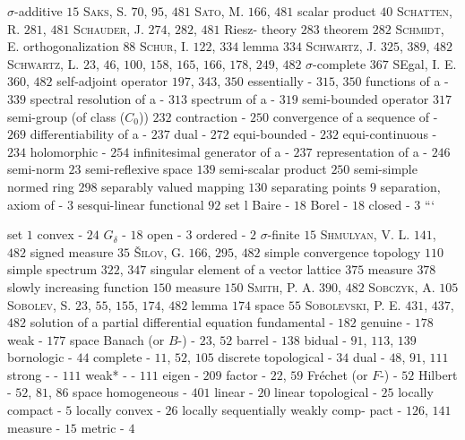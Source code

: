$\sigma$-additive $15$ \textsc{Saks}, S. $70$, $95$, $481$ \textsc{Sato}, M. $166$, $481$ scalar product $40$ \textsc{Schatten}, R. $281$, $481$ \textsc{Schauder}, J. $274$, $282$, $481$ Riesz- theory $283$ theorem $282$ \textsc{Schmidt}, E. orthogonalization $88$ \textsc{Schur}, I. $122$, $334$ lemma $334$ \textsc{Schwartz}, J. $325$, $389$, $482$ \textsc{Schwartz}, L. $23$, $46$, $100$, $158$, $165$, $166$, $178$, $249$, $482$ $\sigma$-complete $367$ SEgal, I. E. $360$, $482$ self-adjoint operator $197$, $343$, $350$ essentially - $315$, $350$ functions of a - $339$ spectral resolution of a - $313$ spectrum of a - $319$ semi-bounded operator $317$ semi-group (of class ($C_0$)) $232$ contraction - $250$ convergence of a sequence of - $269$ differentiability of a - $237$ dual - $272$ equi-bounded - $232$ equi-continuous - $234$ holomorphic - $254$ infinitesimal generator of a - $237$ representation of a - $246$ semi-norm $23$ semi-reflexive space $139$ semi-scalar product $250$ semi-simple normed ring $298$ separably valued mapping $130$ separating points $9$ separation, axiom of - $3$ sesqui-linear functional $92$ set l Baire - $18$ Borel - $18$ closed - $3$ ```

set $1$ convex - $24$ $G_{\delta}$ - $18$ open - $3$ ordered - $2$ $\sigma$-finite $15$ \textsc{Shmulyan}, V. L. $141$, $482$ signed measure $35$ \textsc{Šilov}, G. $166$, $295$, $482$ simple convergence topology $110$ simple spectrum $322$, $347$ singular element of a vector lattice $375$ measure $378$ slowly increasing function $150$ measure $150$ \textsc{Smith}, P. A. $390$, $482$ \textsc{Sobczyk}, A. $105$ \textsc{Sobolev}, S. $23$, $55$, $155$, $174$, $482$ lemma $174$ space $55$ \textsc{Sobolevski}, P. E. $431$, $437$, $482$ solution of a partial differential equation fundamental - $182$ genuine - $178$ weak - $177$ space Banach (or $B$-) - $23$, $52$ barrel - $138$ bidual - $91$, $113$, $139$ bornologic - $44$ complete - $11$, $52$, $105$ discrete topological - $34$ dual - $48$, $91$, $111$ strong - - $111$ weak* - - $111$ eigen - $209$ factor - $22$, $59$ Fréchet (or $F$-) - $52$ Hilbert - $52$, $81$, $86$ space homogeneous - $401$ linear - $20$ linear topological - $25$ locally compact - $5$ locally convex - $26$ locally sequentially weakly comp- pact - $126$, $141$ measure - $15$ metric - $4$ 

